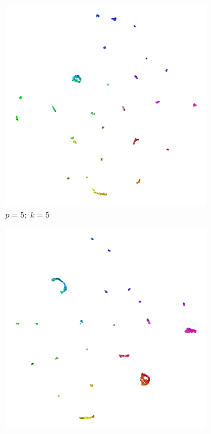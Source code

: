 \begin{figure}[!p]
  \centering
  \begin{subfigure}{0.3\linewidth}
    \centering
    \includegraphics[width=\linewidth]{img/ktsne_color_n_10000_embedding_eta_200_p_5_l_100_crosspolytope_k_5_K_5_pca_x_12_X_1_s_666-1}
    \caption{$p = 5;\; k = 5$}
  \end{subfigure}
\begin{subfigure}{0.3\linewidth}
  \centering
    \includegraphics[width=\linewidth]{img/ktsne_color_n_10000_embedding_eta_200_p_25_l_100_crosspolytope_k_5_K_5_pca_x_12_X_1_s_666-1}

\end{subfigure}
\end{figure}
